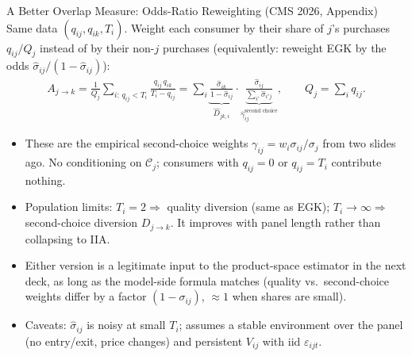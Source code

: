 \documentclass[aspectratio=169,10pt]{beamer}
\begin{document}
\begin{frame}{A Better Overlap Measure: Odds-Ratio Reweighting (CMS 2026, Appendix)}
\small
Same data $(q_{ij}, q_{ik}, T_i)$. Weight each consumer by their share of $j$'s purchases $q_{ij}/Q_j$ instead of by their non-$j$ purchases (equivalently: reweight EGK by the odds $\hat{\sigma}_{ij}/(1-\hat{\sigma}_{ij})$):
\begin{align*}
A_{j \rightarrow k} = \frac{1}{Q_j} \sum_{i:\, q_{ij} < T_i} \frac{q_{ij}\, q_{ik}}{T_i - q_{ij}}
= \sum_i \underbrace{\frac{\hat{\sigma}_{ik}}{1-\hat{\sigma}_{ij}}}_{\hat{D}_{jk,i}} \cdot \underbrace{\frac{\hat{\sigma}_{ij}}{\sum_{i'} \hat{\sigma}_{i'j}}}_{\hat{\gamma}_{ij}^{\text{second choice}}}, \qquad Q_j = \sum_i q_{ij}.
\end{align*}
\begin{itemize}
    \item These are the empirical \alert{second-choice weights} $\gamma_{ij} = w_i \sigma_{ij}/\sigma_j$ from two slides ago. No conditioning on $\mathcal{C}_j$; consumers with $q_{ij}=0$ or $q_{ij}=T_i$ contribute nothing.
    \item Population limits: $T_i = 2 \Rightarrow$ quality diversion (same as EGK); $T_i \rightarrow \infty \Rightarrow$ \alert{second-choice diversion} $D_{j \rightarrow k}$. It \alert{improves} with panel length rather than collapsing to IIA.
    \item Either version is a legitimate input to the product-space estimator in the next deck, as long as the model-side formula matches (quality vs.\ second-choice weights differ by a factor $(1-\sigma_{ij})$, $\approx 1$ when shares are small).
    \item Caveats: $\hat{\sigma}_{ij}$ is noisy at small $T_i$; assumes a stable environment over the panel (no entry/exit, price changes) and persistent $V_{ij}$ with iid $\varepsilon_{ijt}$.
\end{itemize}
\end{frame}
\end{document}
